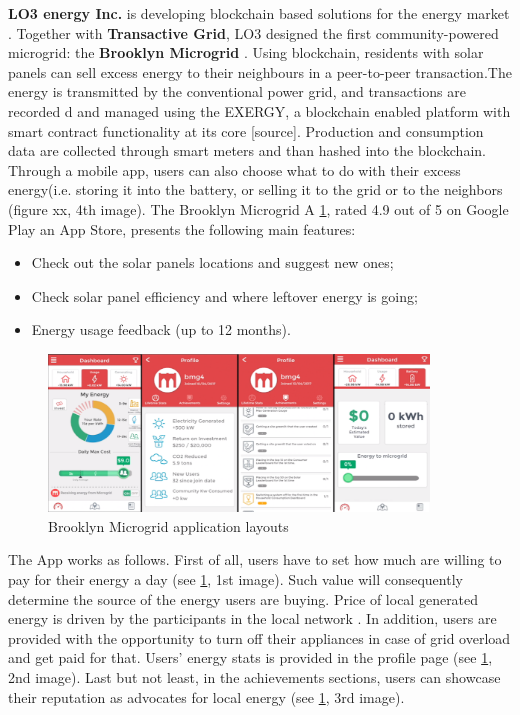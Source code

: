 \textbf{LO3 energy Inc.} is developing blockchain based solutions for the energy market \cite{lo3energy}. Together with \textbf{Transactive Grid}, LO3 designed the first community-powered microgrid: the \textbf{Brooklyn Microgrid} \cite{lo3energy}. Using blockchain, residents with solar panels can sell excess energy to their neighbours in a peer-to-peer transaction.The energy is transmitted by the conventional power grid, and transactions are recorded d and managed using the EXERGY, a blockchain enabled platform with smart contract functionality at its core [source]. Production and consumption data are collected through smart meters and than hashed into the blockchain. Through a mobile app, users can also choose what to do with their excess energy(i.e. storing it into the battery, or selling it to the grid or to the neighbors (figure xx, 4th image).  The Brooklyn Microgrid A \cref{fig:microgrid}, rated 4.9 out of 5 on Google Play an App Store, presents the following main features:

\begin{itemize}
    \item Check out the solar panels locations and suggest new ones;
    \item Check solar panel efficiency and where leftover energy is going;
    \item Energy usage feedback (up to 12 months).
\end{itemize}

\begin{figure}[h]
\centering
\includegraphics[width=0.9\textwidth]{./Images/microgrid}
\caption{Brooklyn Microgrid application layouts}
\label{fig:microgrid}
\end{figure}

The App works as follows. First of all, users have to set how much are willing to pay for their energy a day (see \cref{fig:microgrid}, 1st image). Such value will consequently determine the source of the energy users are buying. Price of local generated energy is driven by the participants in the local network \cite{vimeo}. In addition, users are provided with the opportunity to turn off their appliances in case of grid overload and get paid for that. Users’ energy stats is provided in the profile page (see \cref{fig:microgrid}, 2nd image). Last but not least, in the achievements sections, users can showcase their reputation as advocates for local energy (see \cref{fig:microgrid}, 3rd image).




